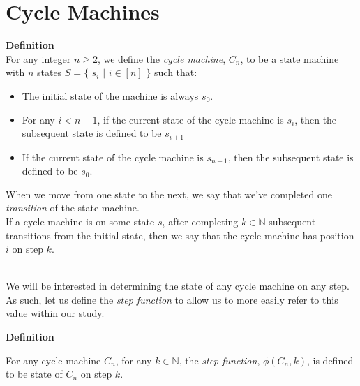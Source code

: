 \documentclass[a4paper,12pt]{article}
\begin{document}
\section{Cycle Machines}
\label{section:cycle_machines}

\label{definition:cycle_machine}
\hypertarget{definition:cycle_machine}{}
\begin{tcolorbox}
\textbf{Definition}\\
For any integer $n \geq 2$, we define the \textit{cycle machine}, $C_n$, to be a state machine with $n$ states $S = \{$ $s_i$ $|$ $i \in [n]$ $\}$ such that:

\begin{itemize}
\item The initial state of the machine is always $s_0$.

\item For any $i < n - 1$, if the current state of the cycle machine is $s_i$, then the subsequent state is defined to be $s_{i+1}$

\item If the current state of the cycle machine is $s_{n - 1}$, then the subsequent state is defined to be $s_0$.
\end{itemize}

\noindent When we move from one state to the next, we say that we've completed one \textit{transition} of the state machine.\\

\noindent If a cycle machine is on some state $s_i$ after completing $k \in \mathbb{N}$ subsequent transitions from the initial state, then we say that the cycle machine has position $i$ on step $k$.\\
\end{tcolorbox}



\noindent \\
We will be interested in determining the state of any cycle machine on any step. As such, let us define the \textit{step function} to allow us to more easily refer to this value within our study.\\









\label{definition:cycle_step_function}
\hypertarget{definition:cycle_step_function}{}
\begin{tcolorbox}
\textbf{Definition}

\noindent For any cycle machine $C_n$, for any $k \in \mathbb{N}$, the \textit{step function}, $\phi(C_n, k)$, is defined to be state of $C_n$ on step $k$.
\end{tcolorbox}
\end{document}
